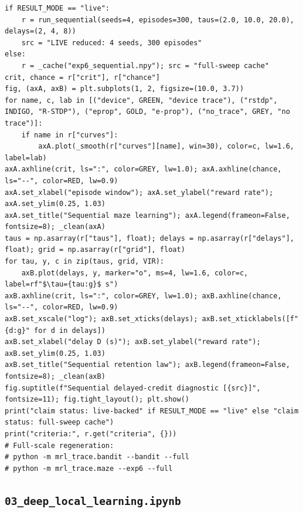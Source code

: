 \begin{lstlisting}[caption={02\_closed\_loop\_rl.ipynb code cell 5},label={lst:mrl-nb-02-closed-loop-rl-5}]
if RESULT_MODE == "live":
    r = run_sequential(seeds=4, episodes=300, taus=(2.0, 10.0, 20.0), delays=(2, 4, 8))
    src = "LIVE reduced: 4 seeds, 300 episodes"
else:
    r = _cache("exp6_sequential.npy"); src = "full-sweep cache"
crit, chance = r["crit"], r["chance"]
fig, (axA, axB) = plt.subplots(1, 2, figsize=(10.0, 3.7))
for name, c, lab in [("device", GREEN, "device trace"), ("rstdp", INDIGO, "R-STDP"), ("eprop", GOLD, "e-prop"), ("no_trace", GREY, "no trace")]:
    if name in r["curves"]:
        axA.plot(_smooth(r["curves"][name], win=30), color=c, lw=1.6, label=lab)
axA.axhline(crit, ls=":", color=GREY, lw=1.0); axA.axhline(chance, ls="--", color=RED, lw=0.9)
axA.set_xlabel("episode window"); axA.set_ylabel("reward rate"); axA.set_ylim(0.25, 1.03)
axA.set_title("Sequential maze learning"); axA.legend(frameon=False, fontsize=8); _clean(axA)
taus = np.asarray(r["taus"], float); delays = np.asarray(r["delays"], float); grid = np.asarray(r["grid"], float)
for tau, y, c in zip(taus, grid, VIR):
    axB.plot(delays, y, marker="o", ms=4, lw=1.6, color=c, label=rf"$\tau={tau:g}$ s")
axB.axhline(crit, ls=":", color=GREY, lw=1.0); axB.axhline(chance, ls="--", color=RED, lw=0.9)
axB.set_xscale("log"); axB.set_xticks(delays); axB.set_xticklabels([f"{d:g}" for d in delays])
axB.set_xlabel("delay D (s)"); axB.set_ylabel("reward rate"); axB.set_ylim(0.25, 1.03)
axB.set_title("Sequential retention law"); axB.legend(frameon=False, fontsize=8); _clean(axB)
fig.suptitle(f"Sequential delayed-credit diagnostic [{src}]", fontsize=11); fig.tight_layout(); plt.show()
print("claim status: live-backed" if RESULT_MODE == "live" else "claim status: full-sweep cache")
print("criteria:", r.get("criteria", {}))
# Full-scale regeneration:
# python -m mrl_trace.bandit --bandit --full
# python -m mrl_trace.maze --exp6 --full
\end{lstlisting}

\subsection{\texttt{03\_deep\_local\_learning.ipynb}}

